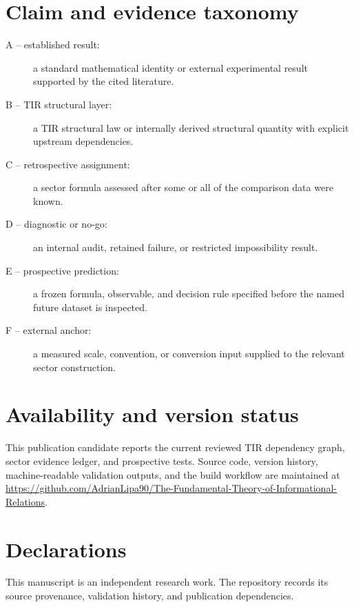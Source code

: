 \section*{Claim and evidence taxonomy}
\begin{description}
  \item[A -- established result:] a standard mathematical identity or external
  experimental result supported by the cited literature.
  \item[B -- TIR structural layer:] a TIR structural law or internally derived
  structural quantity with explicit upstream dependencies.
  \item[C -- retrospective assignment:] a sector formula assessed after some or
  all of the comparison data were known.
  \item[D -- diagnostic or no-go:] an internal audit, retained failure, or
  restricted impossibility result.
  \item[E -- prospective prediction:] a frozen formula, observable, and decision
  rule specified before the named future dataset is inspected.
  \item[F -- external anchor:] a measured scale, convention, or conversion input
  supplied to the relevant sector construction.
\end{description}

\section*{Availability and version status}
This publication candidate reports the current reviewed TIR dependency graph,
sector evidence ledger, and prospective tests. Source code, version history,
machine-readable validation outputs, and the build workflow are maintained at
\url{https://github.com/AdrianLipa90/The-Fundamental-Theory-of-Informational-Relations}.

\section*{Declarations}
This manuscript is an independent research work. The repository records its
source provenance, validation history, and publication dependencies.

\cleardoublepage
